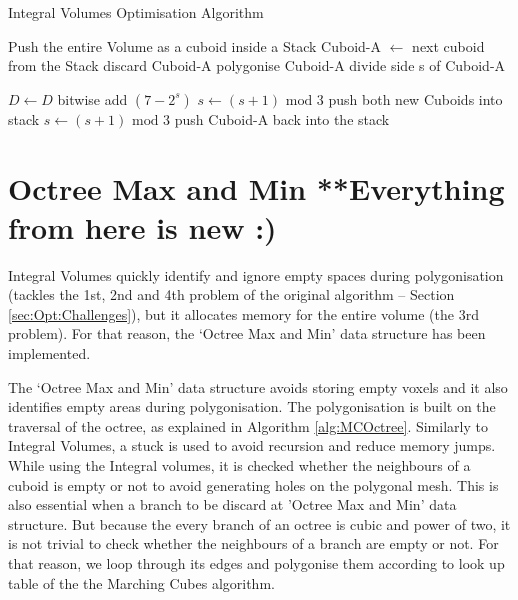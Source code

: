 \documentclass{subfiles}
\begin{document}
\begin{algorithm}[!htbp]
	\caption{Integral Volumes Optimisation Algorithm}
	\label{alg:IVoptAdvance}
	\centering
	\begin{algorithmic}[1]
		\State Push the entire Volume as a cuboid inside a Stack
			\State Cuboid-A   $\gets$  next cuboid from the Stack 
				\State	discard Cuboid-A
				\State polygonise Cuboid-A
				\State	divide side s of Cuboid-A 
		
					\State	$D \gets D$ bitwise add $(7-2^s)$
				\EndIf
				\State 	$s \gets (s+1) \text{ mod } 3$
				\State push both new Cuboids into stack
			\Else 
				\State $s \gets (s+1) \text{ mod } 3$
				\State push Cuboid-A back into the stack
			\EndIf
		\EndWhile
	\end{algorithmic}
\end{algorithm}

\newpage

\rhead{ }
\section{Octree Max and Min {\color{red} **Everything from here is new :)}} \label{sec:OctreeMaxMin}

\par Integral Volumes quickly identify and ignore empty spaces during polygonisation (tackles the 1st, 2nd and 4th problem of the original algorithm -- Section \ref{sec:Opt:Challenges}), but it allocates memory for the entire volume (the 3rd problem). For that reason, the `Octree Max and Min' data structure has been implemented. 

\par The `Octree Max and Min' data structure avoids storing empty voxels and it also identifies empty areas during polygonisation. The polygonisation is built on the traversal of the octree, as explained in Algorithm \ref{alg:MCOctree}. Similarly to Integral Volumes, a stuck is used to avoid recursion and reduce memory jumps. While using the Integral volumes, it is checked whether the neighbours of a cuboid is empty or not to avoid generating holes on the polygonal mesh. This is also essential when a branch to be discard at 'Octree Max and Min' data structure. But because the every branch of an octree is cubic and power of two, it is not trivial to check whether the neighbours of a branch are empty or not. For that reason, we loop through its edges and polygonise them according to look up table of the the Marching Cubes algorithm. 
\end{document}
